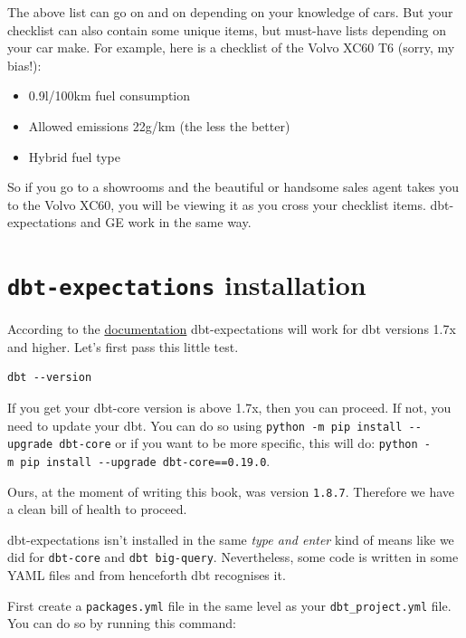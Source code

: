\documentclass[
]{book}
\providecommand{\tightlist}{%
  \setlength{\itemsep}{0pt}\setlength{\parskip}{0pt}}
\begin{document}
The above list can go on and on depending on your knowledge of cars. But your checklist can also contain some unique items, but must-have lists depending on your car make. For example, here is a checklist of the Volvo XC60 T6 (sorry, my bias!):

\begin{itemize}
\tightlist
\item
  0.9l/100km fuel consumption
\item
  Allowed emissions 22g/km (the less the better)
\item
  Hybrid fuel type
\end{itemize}

So if you go to a showrooms and the beautiful or handsome sales agent takes you to the Volvo XC60, you will be viewing it as you cross your checklist items. dbt-expectations and GE work in the same way.

\hypertarget{dbt-expectations-installation}{%
\section{\texorpdfstring{\texttt{dbt-expectations} installation}{dbt-expectations installation}}\label{dbt-expectations-installation}}

According to the \href{https://hub.getdbt.com/calogica/dbt_expectations/latest/}{documentation} dbt-expectations will work for dbt versions 1.7x and higher. Let's first pass this little test.

\begin{verbatim}
dbt --version
\end{verbatim}

If you get your dbt-core version is above 1.7x, then you can proceed. If not, you need to update your dbt. You can do so using \texttt{python\ -m\ pip\ install\ -\/-upgrade\ dbt-core} or if you want to be more specific, this will do: \texttt{python\ -m\ pip\ install\ -\/-upgrade\ dbt-core==0.19.0}.

Ours, at the moment of writing this book, was version \texttt{1.8.7}. Therefore we have a clean bill of health to proceed.

dbt-expectations isn't installed in the same \emph{type and enter} kind of means like we did for \texttt{dbt-core} and \texttt{dbt\ big-query}. Nevertheless, some code is written in some YAML files and from henceforth dbt recognises it.

First create a \texttt{packages.yml} file in the same level as your \texttt{dbt\_project.yml} file. You can do so by running this command:
\end{document}
